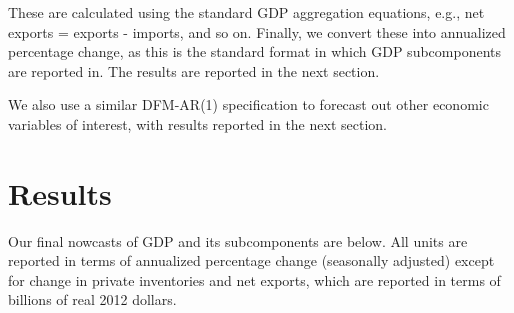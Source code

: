 \documentclass[11pt, letterpaper]{article}\usepackage[]{graphicx}\usepackage[]{color}
\begin{document}
These are calculated using the standard GDP aggregation equations, e.g., net exports = exports - imports, and so on.
Finally, we convert these into annualized percentage change, as this is the standard format in which GDP subcomponents are reported in. The results are reported in the next section.

We also use a similar DFM-AR(1) specification to forecast out other economic variables of interest, with results reported in the next section.


\section{Results}
Our final nowcasts of GDP and its subcomponents are below. All units are reported in terms of annualized percentage change (seasonally adjusted) except for change in private inventories and net exports, which are reported in terms of billions of real 2012 dollars.
\end{document}
